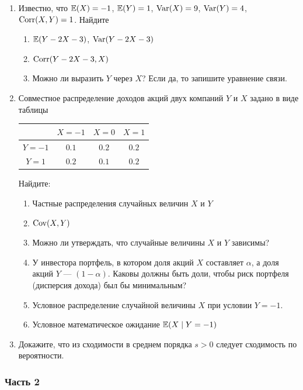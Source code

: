 \begin{enumerate}
\item Известно, что  $\operatorname{\mathbb{E}}(X)=-1$, $\operatorname{\mathbb{E}}(Y)=1$, $\operatorname{Var}(X)=9$, $\operatorname{Var}(Y)=4$, $\operatorname{Corr}(X,Y)=1$.
Найдите
\begin{enumerate}
\item $\operatorname{\mathbb{E}}(Y-2X-3)$, $\operatorname{Var}(Y-2X-3)$
\item  $\operatorname{Corr}(Y-2X-3,X)$
\item Можно ли выразить $Y$ через $X$? Если да, то запишите уравнение связи.
\end{enumerate}

\item Совместное распределение доходов акций двух компаний $Y$ и $X$ задано в виде
таблицы
\begin{center}
\begin{tabular}{@{}cccc@{}}
\toprule
    & $X=-1$ & $X=0$ & $X=1$ \\ \midrule
$Y=-1$ & $0.1$  & $0.2$   & $0.2$ \\
$Y=1$ & $0.2$  & $0.1$ & $0.2$ \\ \bottomrule
\end{tabular}
\end{center}

Найдите:
\begin{enumerate}
\item Частные распределения случайных величин $X$ и $Y$
\item $\operatorname{Cov}(X,Y)$
\item Можно ли утверждать, что случайные величины $X$ и $Y$ зависимы?
\item У инвестора портфель, в котором доля акций $X$ составляет $\alpha$,
а доля акций $Y$ — $(1-\alpha)$. Каковы должны быть доли, чтобы риск портфеля
(дисперсия дохода) был бы минимальным?
\item Условное распределение случайной величины $X$ при условии $Y=-1$.
\item Условное математическое ожидание $\operatorname{\mathbb{E}}(X\mid Y=-1)$
\end{enumerate}
\item Докажите, что из сходимости в среднем порядка $s>0$ следует сходимость
по вероятности.
\end{enumerate}


\subsubsection*{Часть 2}

